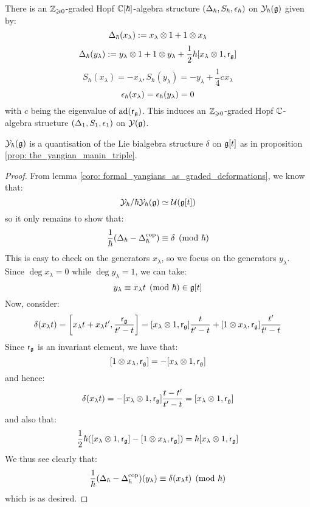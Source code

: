         \begin{theorem} \label{theorem: yangian_hopf_structure}
            There is an $\mathbb{Z}_{\geqslant 0}$-graded Hopf $\mathbb{C}[\hbar]$-algebra structure $(\Delta_{\hbar}, S_{\hbar}, \epsilon_{\hbar})$ on $\mathcal{Y}_{\hbar}(\mathfrak{g})$ given by:
                $$\Delta_{\hbar}(x_{\lambda}) := x_{\lambda} \tensor 1 + 1 \tensor x_{\lambda}$$
                $$\Delta_{\hbar}(y_{\lambda}) := y_{\lambda} \tensor 1 + 1 \tensor y_{\lambda} + \frac12 \hbar [x_{\lambda} \tensor 1, \sfr_{\g}]$$
                $$S_{\hbar}(x_{\lambda}) = -x_{\lambda}, S_{\hbar}(y_{\lambda}) = -y_{\lambda} + \frac14 c_{} x_{\lambda}$$
                $$\epsilon_{\hbar}(x_{\lambda}) = \epsilon_{\hbar}(y_{\lambda}) = 0$$
            with $c$ being the eigenvalue of $\mathrm{ad}(\mathsf{r}_{\mathfrak{g}})$. This induces an $\mathbb{Z}_{\geqslant 0}$-graded Hopf $\mathbb{C}$-algebra structure $(\Delta_1, S_1, \epsilon_1)$ on $\mathcal{Y}(\mathfrak{g})$.
        \end{theorem}
        \begin{corollary} \label{coro: yangians_as_quantisations}
            $\mathcal{Y}_{\hbar}(\mathfrak{g})$ is a quantisation of the Lie bialgebra structure $\delta$ on $\mathfrak{g}[t]$ as in proposition \ref{prop: the_yangian_manin_triple}.
        \end{corollary}
            \begin{proof}
                From lemma \ref{coro: formal_yangians_as_graded_deformations}, we know that:
                    $$\mathcal{Y}_{\hbar}/\hbar\mathcal{Y}_{\hbar}(\mathfrak{g}) \simeq \mathcal{U}(\mathfrak{g}[t])$$
                so it only remains to show that:
                    $$\frac{1}{\hbar}( \Delta_{\hbar} - \Delta_{\hbar}^{\mathrm{cop}} ) \equiv \delta \pmod{\hbar}$$
                This is easy to check on the generators $x_{\lambda}$, so we focus on the generators $y_{\lambda}$. Since $\deg x_{\lambda} = 0$ while $\deg y_{\lambda} = 1$, we can take:
                    $$y_{\lambda} \equiv x_{\lambda} t \pmod{\hbar} \in \mathfrak{g}[t]$$
                Now, consider:
                    $$\delta(x_{\lambda} t) = \left[ x_{\lambda} t + x_{\lambda} t', \frac{\sfr_{\g}}{t' - t} \right] = [x_{\lambda} \tensor 1, \sfr_{\g}] \frac{t}{t' - t} + [1 \tensor x_{\lambda}, \sfr_{\g}] \frac{t'}{t' - t}$$
                Since $\mathsf{r}_{\mathfrak{g}}$ is an invariant element, we have that:
                    $$[1 \tensor x_{\lambda}, \sfr_{\g}] = -[x_{\lambda} \tensor 1, \sfr_{\g}]$$
                and hence:
                    $$\delta(x_{\lambda} t) = -[x_{\lambda} \tensor 1, \sfr_{\g}] \frac{t - t'}{t' - t} = [x_{\lambda} \tensor 1, \sfr_{\g}]$$
                and also that:
                    $$\frac12 \hbar ( [x_{\lambda} \tensor 1, \sfr_{\g}] - [1 \tensor x_{\lambda}, \sfr_{\g}] ) = \hbar [x_{\lambda} \tensor 1, \sfr_{\g}]$$
                We thus see clearly that:
                    $$\frac{1}{\hbar}( \Delta_{\hbar} - \Delta_{\hbar}^{\mathrm{cop}} )(y_{\lambda}) \equiv \delta(x_{\lambda} t) \pmod{\hbar}$$
                which is as desired. 
            \end{proof}
